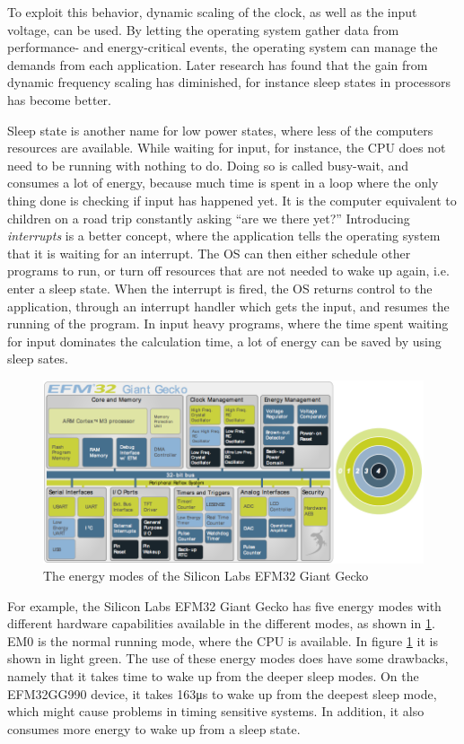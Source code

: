 To exploit this behavior, dynamic scaling of the clock, as well as the input voltage, can be used.
By letting the operating system gather data from performance- and energy-critical events, the operating system can manage the demands from each application. \citep{Weissel2002}
Later research has found that the gain from dynamic frequency scaling has diminished, for instance sleep states in processors has become better.\citep{lesuer2010}

Sleep state is another name for low power states, where less of the computers resources are available.
While waiting for input, for instance, the CPU does not need to be running with nothing to do.
Doing so is called busy-wait, and consumes a lot of energy, because much time is spent in a loop where the only thing done is checking if input has happened yet.
It is the computer equivalent to children on a road trip constantly asking ``are we there yet?''
Introducing \emph{interrupts} is a better concept, where the application tells the operating system that it is waiting for an interrupt.
The OS can then either schedule other programs to run, or turn off resources that are not needed to wake up again, i.e. enter a sleep state.
When the interrupt is fired, the OS returns control to the application, through an interrupt handler which gets the input, and resumes the running of the program.
In input heavy programs, where the time spent waiting for input dominates the calculation time, a lot of energy can be saved by using sleep sates.

\begin{figure}[h!]
\centering
\includegraphics[scale=0.4]{fig/pics/EFM32EM.png}
\caption{The energy modes of the Silicon Labs EFM32 Giant Gecko}
\label{fig:efm32em}
\end{figure}

For example, the Silicon Labs EFM32 Giant Gecko has five energy modes with different hardware capabilities available in the different modes, as shown in \cref{fig:efm32em}.
EM0 is the normal running mode, where the CPU is available.
In figure \ref{fig:efm32em} it is shown in light green.
The use of these energy modes does have some drawbacks, namely that it takes time to wake up from the deeper sleep modes.
On the EFM32GG990 device, it takes 163\si{\micro\second} to wake up from the deepest sleep mode, which might cause problems in timing sensitive systems.
In addition, it also consumes more energy to wake up from a sleep state.

